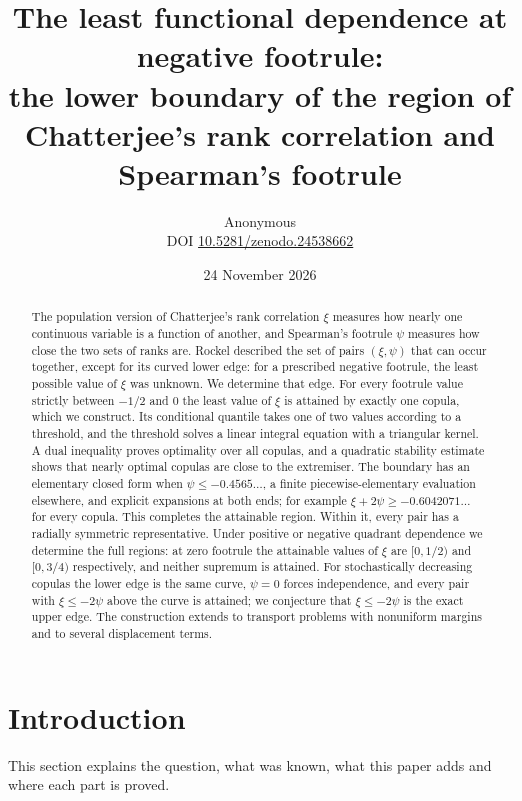 \documentclass[11pt,a4paper]{article}
\title{The least functional dependence at negative footrule:\\ the lower boundary of the region of Chatterjee's rank correlation and Spearman's footrule}
\author{Anonymous\\[3pt]{\small DOI \href{https://doi.org/10.5281/zenodo.24538662}{10.5281/zenodo.24538662}}}
\date{24 November 2026}
\theoremstyle{remark}
\newcommand{\1}{\mathbf 1}
\begin{document}
\maketitle
\begin{abstract}
The population version of Chatterjee's rank correlation $\xi$ measures how nearly one continuous variable is a function of another, and Spearman's footrule $\psi$ measures how close the two sets of ranks are. Rockel described the set of pairs $(\xi,\psi)$ that can occur together, except for its curved lower edge: for a prescribed negative footrule, the least possible value of $\xi$ was unknown. We determine that edge. For every footrule value strictly between $-1/2$ and $0$ the least value of $\xi$ is attained by exactly one copula, which we construct. Its conditional quantile takes one of two values according to a threshold, and the threshold solves a linear integral equation with a triangular kernel. A dual inequality proves optimality over all copulas, and a quadratic stability estimate shows that nearly optimal copulas are close to the extremiser. The boundary has an elementary closed form when $\psi\le-0.4565\ldots$, a finite piecewise-elementary evaluation elsewhere, and explicit expansions at both ends; for example $\xi+2\psi\ge-0.6042071\ldots$ for every copula. This completes the attainable region. Within it, every pair has a radially symmetric representative. Under positive or negative quadrant dependence we determine the full regions: at zero footrule the attainable values of $\xi$ are $[0,1/2)$ and $[0,3/4)$ respectively, and neither supremum is attained. For stochastically decreasing copulas the lower edge is the same curve, $\psi=0$ forces independence, and every pair with $\xi\le-2\psi$ above the curve is attained; we conjecture that $\xi\le-2\psi$ is the exact upper edge. The construction extends to transport problems with nonuniform margins and to several displacement terms.
\end{abstract}

\section{Introduction}\label{sec:intro}
This section explains the question, what was known, what this paper adds and where each part is proved.
\end{document}
